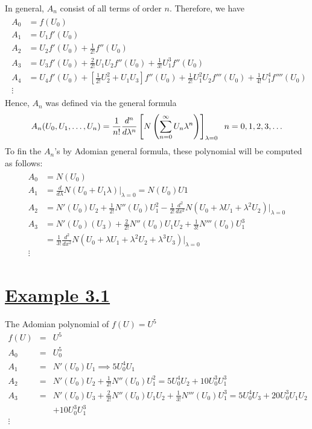 \documentclass[11pt]{report}
\newcommand{\ubt}[1]{\textbf{\underline{#1}}}
\newcommand{\sps}{\\[0.2cm]}
\newcommand{\NI}{\noindent}
\newcommand{\sprime}{'}
\newcommand{\dprime}{''}
\newcommand{\tprime}{'''}
\newcommand{\example}[1]{\section*{\ubt{Example #1}}}
\begin{document}
	\NI In general, $A_n$ consist of all terms of order $n$. Therefore, we have
	\begin{eqnarray}
		\begin{split}
			A_0 &= f(U_0)\sps
			A_1 &= U_1f\sprime(U_0)\sps
			A_2 &= U_2f\sprime(U_0)+ \frac{1}{2!}f\dprime(U_0)\sps
			A_3 &= U_3f\sprime(U_0) + \frac{2}{2!}U_1U_2f\dprime(U_0)+ \frac{1}{3!}U_1^3f\dprime(U_0)\sps
			A_4 &= U_4f\sprime(U_0) + \left[\frac{1}{2!}U_2^2 + U_1U_3\right]f\dprime(U_0) + \frac{1}{2!}U_1^2U_2f\tprime(U_0) + \frac{1}{4!}U_1^4f''''(U_0)\sps
			\vdots
		\end{split}
	\end{eqnarray}
	Hence, $A_n$ was defined via the general formula
	\begin{eqnarray}
		A_n(U_0,U_1,\ldots,U_n) = \frac{1}{n!}\frac{d^n}{d\lambda^n}\left[  N\left( \sum_{n=0}^\infty U_n\lambda^n \right)  \right]_{\lambda=0} \hspace{.2cm} n=0,1,2,3,\ldots
	\end{eqnarray}
	To fin the $A_n$'s by Adomian general formula, these polynomial will be computed as follows:
	\begin{eqnarray*}
		\begin{split}
			A_0 &= N(U_0)\sps
			A_1 &= \frac{d}{d\lambda}N(U_0+U_1\lambda)\Big|_{\lambda=0} = N(U_0)U1\sps
			A_2 &= N\sprime(U_0)U_2 + \frac{1}{2!}N\dprime(U_0)U_1^2 - \frac{1}{2!}\frac{d^2}{dx^2}N(U_0+\lambda U_1 + \lambda^2 U_2)\Big|_{\lambda=0}\sps
			A_3 &= N\sprime(U_0)(U_3) + \frac{2}{2!}N\dprime(U_0)U_1U_2 + \frac{1}{3!}N\tprime(U_0)U_1^3\\  
			&= \frac{1}{3!}\frac{d^2}{dx^2}N(U_0+\lambda U_1 + \lambda^2U_2 + \lambda^3U_3)\Big|_{\lambda=0}\sps
			\vdots
		\end{split}
	\end{eqnarray*}
	
	\example{3.1}
	The Adomian polynomial of $f(U) = U^5$
	\begin{eqnarray*}
		f(U) &=&U^5\sps
		A_0 &=& U_0^5\sps
		A_1 &=& N\sprime(U_0)U_1 \implies 5U_0^4U_1\sps
		A_2 &=& N\sprime(U_0)U_2 + \frac{1}{2!}N\dprime(U_0)U_1^2  = 5U_0^4U_2+10U_0^3U_1^3\sps
		A_3 &=& N\sprime(U_0)U_3 + \frac{2}{2!}N\dprime(U_0)U_1U_2 + \frac{1}{3!}N\tprime(U_0)U_1^3 = 5U_0^4U_3 + 20U_0^3U_1U_2 \\
		&&+ 10U_0^3U_1^3\sps
		\vdots	
	\end{eqnarray*}


\end{document}
